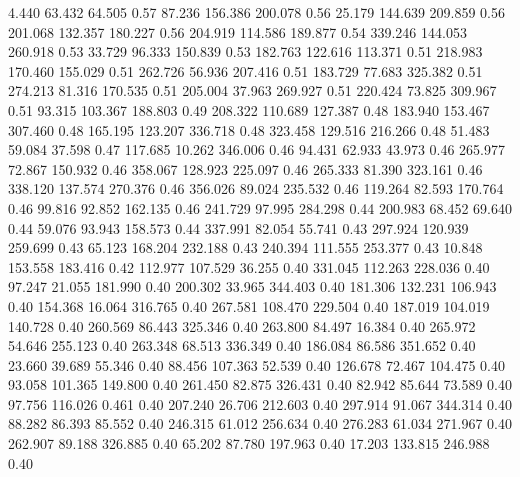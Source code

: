    4.440   63.432   64.505         0.57
  87.236  156.386  200.078         0.56
  25.179  144.639  209.859         0.56
 201.068  132.357  180.227         0.56
 204.919  114.586  189.877         0.54
 339.246  144.053  260.918         0.53
  33.729   96.333  150.839         0.53
 182.763  122.616  113.371         0.51
 218.983  170.460  155.029         0.51
 262.726   56.936  207.416         0.51
 183.729   77.683  325.382         0.51
 274.213   81.316  170.535         0.51
 205.004   37.963  269.927         0.51
 220.424   73.825  309.967         0.51
  93.315  103.367  188.803         0.49
 208.322  110.689  127.387         0.48
 183.940  153.467  307.460         0.48
 165.195  123.207  336.718         0.48
 323.458  129.516  216.266         0.48
  51.483   59.084   37.598         0.47
 117.685   10.262  346.006         0.46
  94.431   62.933   43.973         0.46
 265.977   72.867  150.932         0.46
 358.067  128.923  225.097         0.46
 265.333   81.390  323.161         0.46
 338.120  137.574  270.376         0.46
 356.026   89.024  235.532         0.46
 119.264   82.593  170.764         0.46
  99.816   92.852  162.135         0.46
 241.729   97.995  284.298         0.44
 200.983   68.452   69.640         0.44
  59.076   93.943  158.573         0.44
 337.991   82.054   55.741         0.43
 297.924  120.939  259.699         0.43
  65.123  168.204  232.188         0.43
 240.394  111.555  253.377         0.43
  10.848  153.558  183.416         0.42
 112.977  107.529   36.255         0.40
 331.045  112.263  228.036         0.40
  97.247   21.055  181.990         0.40
 200.302   33.965  344.403         0.40
 181.306  132.231  106.943         0.40
 154.368   16.064  316.765         0.40
 267.581  108.470  229.504         0.40
 187.019  104.019  140.728         0.40
 260.569   86.443  325.346         0.40
 263.800   84.497   16.384         0.40
 265.972   54.646  255.123         0.40
 263.348   68.513  336.349         0.40
 186.084   86.586  351.652         0.40
  23.660   39.689   55.346         0.40
  88.456  107.363   52.539         0.40
 126.678   72.467  104.475         0.40
  93.058  101.365  149.800         0.40
 261.450   82.875  326.431         0.40
  82.942   85.644   73.589         0.40
  97.756  116.026    0.461         0.40
 207.240   26.706  212.603         0.40
 297.914   91.067  344.314         0.40
  88.282   86.393   85.552         0.40
 246.315   61.012  256.634         0.40
 276.283   61.034  271.967         0.40
 262.907   89.188  326.885         0.40
  65.202   87.780  197.963         0.40
  17.203  133.815  246.988         0.40
